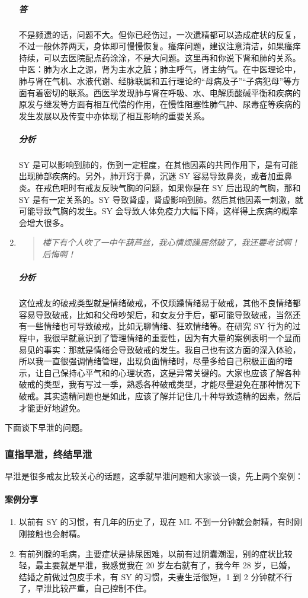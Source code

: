 \documentclass{ctexart}
\begin{document}
\begin{enumerate}
\begin{quote}
    \end{quote}
    \subparagraph{答} 不是频遗的话，问题不大。但你已经伤过，一次遗精都可以造成症状的反复，不过一般休养两天，身体即可慢慢恢复。瘙痒问题，建议注意清洁，如果瘙痒持续，可以去医院配点药涂涂，不是大问题。这里再和你说下肾和肺的关系。中医：肺为水上之源，肾为主水之脏；肺主呼气，肾主纳气。在中医理论中，肺与肾在气机、水液代谢、经脉联属和五行理论的“母病及子”“子病犯母”等方面有着密切的联系。西医学发现肺与肾在呼吸、水、电解质酸碱平衡和疾病的原发与继发等方面有相互代偿的作用，在慢性阻塞性肺气肿、尿毒症等疾病的发生发展以及传变中亦体现了相互影响的重要关系。
    \subparagraph{分析} SY 是可以影响到肺的，伤到一定程度，在其他因素的共同作用下，是有可能出现肺部疾病的。另外，肺开窍于鼻，沉迷 SY 容易导致鼻炎，或者加重鼻炎。在戒色吧时有戒友反映气胸的问题，如果你是在 SY 后出现的气胸，那和 SY 是有一定关系的。SY 导致肾虚，肾虚影响到肺。然后其他因素一刺激，就可能导致气胸的发生。SY 会导致人体免疫力大幅下降，这样得上疾病的概率会增大很多。
    \item \begin{quote}\it
        楼下有个人吹了一中午葫芦丝，我心情烦躁居然破了，我还要考试啊！后悔啊！
    \end{quote}
    \subparagraph{分析} 这位戒友的破戒类型就是情绪破戒，不仅烦躁情绪易于破戒，其他不良情绪都容易导致破戒，比如和父母吵架后，和女友分手后，都可能导致破戒，当然还有一些情绪也可导致破戒，比如无聊情绪、狂欢情绪等。在研究 SY 行为的过程中，我很早就意识到了管理情绪的重要性，因为有大量的案例表明一个显而易见的事实：那就是情绪会导致破戒的发生。我自己也有这方面的深入体验，所以我一直很强调情绪管理，出现负面情绪时，尽量多给自己积极正面的暗示，让自己保持心平气和的心理状态，这是异常关键的。大家也应该了解各种破戒的类型，我有写过一季，熟悉各种破戒类型，才能尽量避免在那种情况下破戒。其实遗精问题也是如此，应该了解并记住几十种导致遗精的因素，然后才能更好地避免。
\end{enumerate}

下面谈下早泄的问题。

\subsubsection{直指早泄，终结早泄}

早泄是很多戒友比较关心的话题，这季就早泄问题和大家谈一谈，先上两个案例：

\paragraph{案例分享}

\begin{enumerate}
    \item 以前有 SY 的习惯，有几年的历史了，现在 ML 不到一分钟就会射精，有时刚刚接触也会射精。
    \item 有前列腺的毛病，主要症状是排尿困难，以前有过阴囊潮湿，别的症状比较轻，最主要就是早泄，我感觉我在 20 岁左右就有了，我今年 28 岁，已婚，结婚之前做过包皮手术，有 SY 的习惯，夫妻生活很短，1 到 2 分钟就不行了，早泄比较严重，自己控制不住。
\end{enumerate}
\end{document}
